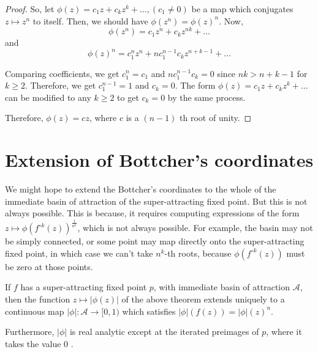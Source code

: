\begin{proof}
So, let $\phi(z)=c_{1} z+c_{k} z^{k}+\ldots,\left(c_{1} \neq 0\right)$ be a map which conjugates $z \mapsto z^{n}$ to itself. Then, we should have $\phi\left(z^{n}\right)=\phi(z)^{n}$. Now,
$$
\phi\left(z^{n}\right)=c_{1} z^{n}+c_{k} z^{n k}+\ldots
$$
and
$$
\phi(z)^{n}=c_{1}^{n} z^{n}+n c_{1}^{n-1} c_{k} z^{n+k-1}+\ldots
$$

Comparing coefficients, we get $c_{1}^{n}=c_{1}$ and $n c_{1}^{n-1} c_{k}=0$ since $n k>n+k-1$ for $k \geq 2$. Therefore, we get $c_{1}^{n-1}=1$ and $c_{k}=0$. The form $\phi(z)=c_{1} z+c_{k} z^{k}+\ldots$ can be modified to any $k \geq 2$ to get $c_{k}=0$ by the same process.

Therefore, $\phi(z)=c z$, where $c$ is a $(n-1)$ th root of unity.
\end{proof}

\section{Extension of Bottcher's coordinates}
We might hope to extend the Bottcher's coordinates to the whole of the immediate basin of attraction of the super-attracting fixed point. But this is not always possible. This is because, it requires computing expressions of the form $z \mapsto\phi\left(f^{\circ k}(z)\right)^{\frac{1}{n^{k}}}$, which is not always possible. For example, the basin may not be simply connected, or some point may map directly onto the super-attracting fixed point, in which case we can't take $n^{k}$-th roots, because $\phi\left(f^{\circ k}(z)\right)$ must be zero at those points.

\begin{theorem}
If $f$ has a super-attracting fixed point $p$, with immediate basin of attraction $\mathcal{A}$, then the function $z \mapsto|\phi(z)|$ of the above theorem extends uniquely to a continuous map $|\phi|: \mathcal{A} \rightarrow[0,1)$ which satisfies $|\phi|(f(z))=|\phi|(z)^{n}$.

Furthermore, $|\phi|$ is real analytic except at the iterated preimages of $p$, where it takes the value 0 .
\end{theorem}

